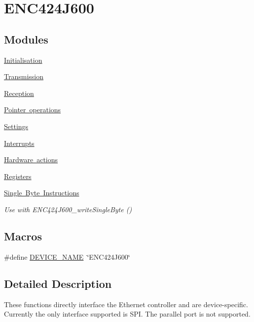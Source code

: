\hypertarget{group__enc424j600__module}{}\section{E\+N\+C424\+J600}
\label{group__enc424j600__module}
\subsection*{Modules}
\begin{DoxyCompactItemize}
\item 
\mbox{\hyperlink{group__init}{Initialisation}}
\item 
\mbox{\hyperlink{group__transmission}{Transmission}}
\item 
\mbox{\hyperlink{group__reception}{Reception}}
\item 
\mbox{\hyperlink{group__pointers}{Pointer operations}}
\item 
\mbox{\hyperlink{group__settings}{Settings}}
\item 
\mbox{\hyperlink{group__interrupts}{Interrupts}}
\item 
\mbox{\hyperlink{group___h_a_r_d_w_a_r_e___a_c_t_i_o_n_s}{Hardware actions}}
\item 
\mbox{\hyperlink{group__registers}{Registers}}
\item 
\mbox{\hyperlink{group__single__byte}{Single Byte Instructions}}
\begin{DoxyCompactList}\small\item\em Use with E\+N\+C424\+J600\+\_\+write\+Single\+Byte () \end{DoxyCompactList}\end{DoxyCompactItemize}
\subsection*{Macros}
\begin{DoxyCompactItemize}
\item 
\#define \mbox{\hyperlink{group__enc424j600__module_ga5f5a2c9450ebc584b4fe743c6b1a280b}{D\+E\+V\+I\+C\+E\+\_\+\+N\+A\+ME}}~\char`\"{}E\+N\+C424\+J600\char`\"{}
\end{DoxyCompactItemize}


\subsection{Detailed Description}
These functions directly interface the Ethernet controller and are device-\/specific. Currently the only interface supported is S\+PI. The parallel port is not supported.

